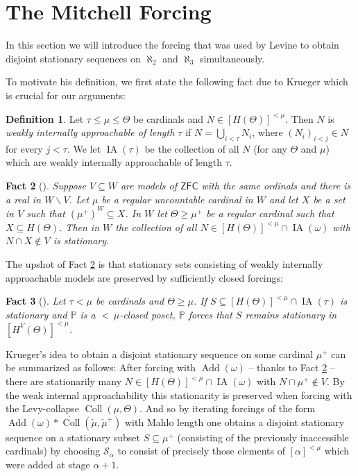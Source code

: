 \documentclass[12pt]{amsart}
\theoremstyle{definition}
\newtheorem{mydef}{Definition}[section]
\theoremstyle{remark}
\theoremstyle{plain}
\newtheorem{myfact}[mydef]{Fact}
\numberwithin{mydef}{section}
\DeclareMathOperator{\Add}{Add}
\DeclareMathOperator{\Coll}{Coll}
\DeclareMathOperator{\IA}{IA}
\newcommand{\dP}{\mathbb{P}}
\newcommand{\ZFC}{\mathsf{ZFC}}
\begin{document}
	\section{The Mitchell Forcing}

	In this section we will introduce the forcing that was used by Levine to obtain disjoint stationary sequences on $\aleph_2$ and $\aleph_3$ simultaneously.
	
	To motivate his definition, we first state the following fact due to Krueger which is crucial for our arguments:
	
	\begin{mydef}
		Let $\tau\leq\mu\leq\Theta$ be cardinals and $N\in[H(\Theta)]^{<\mu}$. Then $N$ is \emph{weakly internally approachable of length $\tau$} if $N=\bigcup_{i<\tau}N_i$, where $(N_i)_{i<j}\in N$ for every $j<\tau$. We let $\IA(\tau)$ be the collection of all $N$ (for any $\Theta$ and $\mu$) which are weakly internally approachable of length $\tau$.
	\end{mydef}
	
	\begin{myfact}[{\cite[Theorem 7.1]{KruegerApplicMSI}}]\label{KruegerFact}
		Suppose $V\subseteq W$ are models of $\ZFC$ with the same ordinals and there is a real in $W\smallsetminus V$. Let $\mu$ be a regular uncountable cardinal in $W$ and let $X$ be a set in $V$ such that $(\mu^+)^W\subseteq X$. In $W$ let $\Theta\geq\mu^+$ be a regular cardinal such that $X\subseteq H(\Theta)$. Then in $W$ the collection of all $N\in[H(\Theta)]^{<\mu}\cap\IA(\omega)$ with $N\cap X\notin V$ is stationary.
	\end{myfact}
	
	The upshot of Fact \ref{KruegerFact} is that stationary sets consisting of weakly internally approachable models are preserved by sufficiently closed forcings:
	
	\begin{myfact}[{\cite[Lemma 2.2 and 2.4]{KruegerApplicMSI}}]\label{IAPreserve}
		Let $\tau<\mu$ be cardinals and $\Theta\geq\mu$. If $S\subseteq[H(\Theta)]^{<\mu}\cap\IA(\tau)$ is stationary and $\dP$ is a ${<}\,\mu$-closed poset, $\dP$ forces that $S$ remains stationary in $[H^V(\Theta)]^{<\mu}$.
	\end{myfact}
	
	Krueger's idea to obtain a disjoint stationary sequence on some cardinal $\mu^+$ can be summarized as follows: After forcing with $\Add(\omega)$ -- thanks to Fact \ref{KruegerFact} -- there are stationarily many $N\in[H(\Theta)]^{<\mu}\cap\IA(\omega)$ with $N\cap\mu^+\notin V$. By the weak internal approachability this stationarity is preserved when forcing with the Levy-collapse $\Coll(\mu,\Theta)$. And so by iterating forcings of the form $\Add(\omega)*\dot{\Coll}(\check{\mu},\check{\mu}^+)$ with Mahlo length one obtains a disjoint stationary sequence on a stationary subset $S\subseteq\mu^+$ (consisting of the previously inaccessible cardinals) by choosing $\mathcal{S}_{\alpha}$ to consist of precisely those elements of $[\alpha]^{<\mu}$ which were added at stage $\alpha+1$.
	
\end{document}
